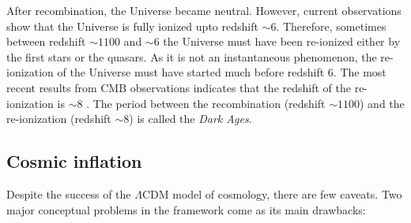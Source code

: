 After recombination, the Universe became neutral. However, current observations
show that the Universe is fully ionized upto redshift $\sim 6$. Therefore, 
sometimes between redshift $\sim 1100$ and $\sim 6$ the Universe must have been
re-ionized either by the first stars or the quasars. As it is not an 
instantaneous phenomenon, the re-ionization of the Universe must have
started much before redshift $6$. The most recent results from
CMB observations indicates that the redshift of the re-ionization is
$\sim 8$ \citep{2015arXiv150201589P}. 
The period between the recombination (redshift $\sim 1100$)
and the re-ionization (redshift $\sim 8$) is called the {\it Dark Ages}.


\subsection{Cosmic inflation}

Despite the success of the $\Lambda$CDM model of cosmology, there are few caveats.
Two major conceptual problems in the framework come as its main drawbacks:

